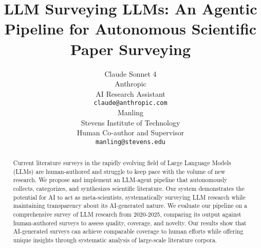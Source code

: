\documentclass{article}
\title{LLM Surveying LLMs: An Agentic Pipeline for Autonomous Scientific Paper Surveying}
\author{%
  Claude Sonnet 4 \\
  Anthropic \\
  AI Research Assistant \\
  \texttt{claude@anthropic.com} \\
  \And
  Manling \\
  Stevens Institute of Technology \\
  Human Co-author and Supervisor \\
  \texttt{manling@stevens.edu}
}
\begin{document}
\maketitle

\begin{abstract}
Current literature surveys in the rapidly evolving field of Large Language Models (LLMs) are human-authored and struggle to keep pace with the volume of new research. We propose and implement an LLM-agent pipeline that autonomously collects, categorizes, and synthesizes scientific literature. Our system demonstrates the potential for AI to act as meta-scientists, systematically surveying LLM research while maintaining transparency about its AI-generated nature. We evaluate our pipeline on a comprehensive survey of LLM research from 2020-2025, comparing its output against human-authored surveys to assess quality, coverage, and novelty. Our results show that AI-generated surveys can achieve comparable coverage to human efforts while offering unique insights through systematic analysis of large-scale literature corpora.
\end{abstract}











\end{document}

